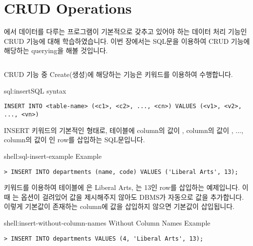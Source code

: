 \section{CRUD Operations}\label{sect:crud-operations}

에서 데이터를 다루는 프로그램이 기본적으로 갖추고 있어야 하는 데이터 처리 기능인 CRUD 기능에 대해 학습하였습니다. 이번 장에서는 SQL문을 이용하여 CRUD 기능에 해당하는 querying을 해볼 것입니다.

\subsection*{}

CRUD 기능 중 Create(생성)에 해당하는 기능은  키워드를 이용하여 수행합니다.

\begin{sqlenv}{sql:insert}{SQL  syntax}\begin{verbatim}
INSERT INTO <table-name> (<c1>, <c2>, ..., <cn>) VALUES (<v1>, <v2>, ..., <vn>)
\end{verbatim}
\end{sqlenv}

\는 INSERT 키워드의 기본적인 형태로,  테이블에  column의 값이 ,  column의 값이 , ...,  column의 값이 인 row를 삽입하는 SQL문입니다.

\begin{shellenv}{shell:sql-insert-example}{ Example}\begin{verbatim}
> INSERT INTO departments (name, code) VALUES ('Liberal Arts', 13);
\end{verbatim}
\end{shellenv}

\은  키워드를 이용하여  테이블에 은 Liberal Arts, 는 13인 row를 삽입하는 예제입니다. 이때 는  옵션이 걸려있어 값을 제시해주지 않아도 DBMS가 자동으로  값을 추가합니다. 이렇게 기본값이 존재하는 column에 값을 삽입하지 않으면 기본값이 삽입됩니다.

\begin{shellenv}{shell:insert-without-column-names}{ Without Column Names Example}\begin{verbatim}
> INSERT INTO departments VALUES (4, 'Liberal Arts', 13);
\end{verbatim}
\end{shellenv}

